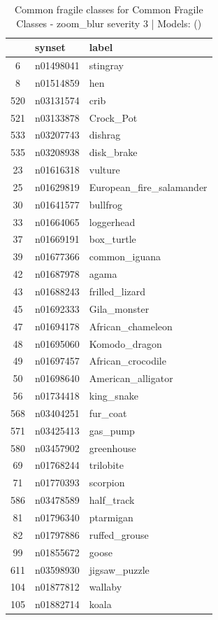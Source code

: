 \begin{table}
\caption{Common fragile classes for Common Fragile Classes - zoom_blur severity 3 | Models: ()}
\label{tab:Common Fragile Classes - zoom_blur severity 3_d41d8cd9}
\begin{tabular}{cll}
\toprule
 & synset & label \\
\midrule
6 & n01498041 & stingray \\
8 & n01514859 & hen \\
520 & n03131574 & crib \\
521 & n03133878 & Crock_Pot \\
533 & n03207743 & dishrag \\
535 & n03208938 & disk_brake \\
23 & n01616318 & vulture \\
25 & n01629819 & European_fire_salamander \\
30 & n01641577 & bullfrog \\
33 & n01664065 & loggerhead \\
37 & n01669191 & box_turtle \\
39 & n01677366 & common_iguana \\
42 & n01687978 & agama \\
43 & n01688243 & frilled_lizard \\
45 & n01692333 & Gila_monster \\
47 & n01694178 & African_chameleon \\
48 & n01695060 & Komodo_dragon \\
49 & n01697457 & African_crocodile \\
50 & n01698640 & American_alligator \\
56 & n01734418 & king_snake \\
568 & n03404251 & fur_coat \\
571 & n03425413 & gas_pump \\
580 & n03457902 & greenhouse \\
69 & n01768244 & trilobite \\
71 & n01770393 & scorpion \\
586 & n03478589 & half_track \\
81 & n01796340 & ptarmigan \\
82 & n01797886 & ruffed_grouse \\
99 & n01855672 & goose \\
611 & n03598930 & jigsaw_puzzle \\
104 & n01877812 & wallaby \\
105 & n01882714 & koala \\

\end{tabular}
\end{table}
